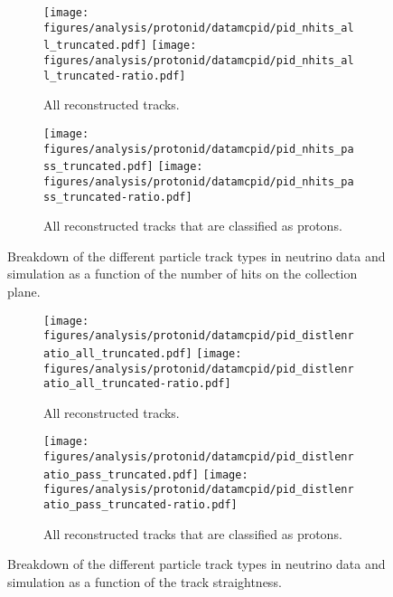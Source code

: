     \begin{figure}[h]
      \centering
      \begin{subfigure}[t]{2.8in}
        \texttt{[image: figures/analysis/protonid/datamcpid/pid\_nhits\_all\_truncated.pdf]}
        \texttt{[image: figures/analysis/protonid/datamcpid/pid\_nhits\_all\_truncated-ratio.pdf]}
        \caption{All reconstructed tracks.}
      \end{subfigure}
      \hspace{2pt}
      \begin{subfigure}[t]{2.8in}
        \texttt{[image: figures/analysis/protonid/datamcpid/pid\_nhits\_pass\_truncated.pdf]}
        \texttt{[image: figures/analysis/protonid/datamcpid/pid\_nhits\_pass\_truncated-ratio.pdf]}
        \caption{All reconstructed tracks that are classified as protons.}
      \end{subfigure}
      \caption{Breakdown of the different particle track types in neutrino data
      and simulation as a function of the number of hits on the collection
      plane.}
      \label{fig:pidnhits}
    \end{figure}
    \begin{figure}[h]
      \centering
      \begin{subfigure}[t]{2.8in}
        \texttt{[image: figures/analysis/protonid/datamcpid/pid\_distlenratio\_all\_truncated.pdf]}
        \texttt{[image: figures/analysis/protonid/datamcpid/pid\_distlenratio\_all\_truncated-ratio.pdf]}
        \caption{All reconstructed tracks.}
      \end{subfigure}
      \hspace{2pt}
      \begin{subfigure}[t]{2.8in}
        \texttt{[image: figures/analysis/protonid/datamcpid/pid\_distlenratio\_pass\_truncated.pdf]}
        \texttt{[image: figures/analysis/protonid/datamcpid/pid\_distlenratio\_pass\_truncated-ratio.pdf]}
        \caption{All reconstructed tracks that are classified as protons.}
      \end{subfigure}
      \caption{Breakdown of the different particle track types in neutrino data
      and simulation as a function of the track straightness.}
      \label{fig:piddistlenratio}
    \end{figure}
